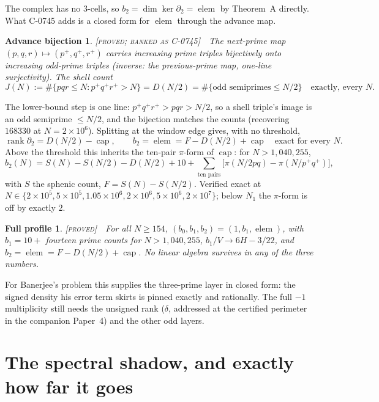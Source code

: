 \documentclass[11pt,reqno]{amsart}
\theoremstyle{plain}
\theoremstyle{definition}
\theoremstyle{plain}
\newtheorem*{advbij}{Advance bijection}
\newtheorem*{fullprof}{Full profile}
\newcommand{\rank}{\operatorname{rank}}
\newcommand{\elem}{\operatorname{elem}}
\newcommand{\cpc}{\operatorname{cap}}
\newcommand{\dd}{\delta}
\newcommand{\st}{\textsc}
\begin{document}
The complex has no $3$-cells, so $b_2=\dim\ker\partial_2=\elem$ by Theorem~A directly. What
C-0745 adds is a closed form for $\elem$ through the advance map.
\begin{advbij}
\textnormal{\st{[proved; banked as C-0745]}}\ \ The next-prime map
$(p,q,r)\mapsto(p^+,q^+,r^+)$ carries increasing prime triples bijectively onto increasing
odd-prime triples (inverse: the previous-prime map, one-line surjectivity). The shell count
\[
J(N):=\#\{pqr\le N: p^+q^+r^+>N\}=D(N/2)=\#\{\text{odd semiprimes}\le N/2\}\quad\text{exactly, every }N.
\]
\end{advbij}
\noindent The lower-bound step is one line: $p^+q^+r^+>pqr>N/2$, so a shell triple's image is
an odd semiprime $\le N/2$, and the bijection matches the counts (recovering $168330$ at
$N=2\times10^6$). Splitting at the window edge gives, with no threshold,
\[
\rank\partial_2=D(N/2)-\cpc,\qquad b_2=\elem=F-D(N/2)+\cpc\quad\text{exact for every }N.
\]
Above the threshold this inherits the ten-pair $\pi$-form of $\cpc$: for $N>1{,}040{,}255$,
\[
b_2(N)=S(N)-S(N/2)-D(N/2)+10+\!\!\sum_{\text{ten pairs}}\!\!\bigl[\pi(N/2pq)-\pi(N/p^+q^+)\bigr],
\]
with $S$ the sphenic count, $F=S(N)-S(N/2)$. Verified exact at
$N\in\{2\times10^5,5\times10^5,1.05\times10^6,2\times10^6,5\times10^6,2\times10^7\}$; below $N_1$
the $\pi$-form is off by exactly $2$.
\begin{fullprof}
\textnormal{\st{[proved]}}\ \ For all $N\ge154$, $(b_0,b_1,b_2)=(1,b_1,\elem)$, with $b_1=10+$
fourteen prime counts for $N>1{,}040{,}255$, $b_1/V\to6H-3/22$, and
$b_2=\elem=F-D(N/2)+\cpc$. No linear algebra survives in any of the three numbers.
\end{fullprof}
\noindent For Banerjee's problem this supplies the three-prime layer in closed form: the signed
density his error term skirts is pinned exactly and rationally. The full $-1$ multiplicity still
needs the unsigned rank ($\dd$, addressed at the certified perimeter in the companion Paper~4) and
the other odd layers.

\section{The spectral shadow, and exactly how far it goes}\label{sec:shadow}
\end{document}
